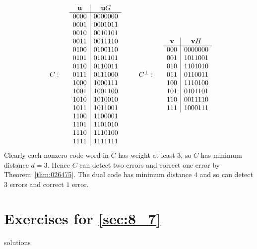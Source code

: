 \begin{equation*}
	\begin{array}{rrc|c}
	&& \vect{u} & \vect{u}G \\ \cline{3-4}
	&& 0000 & 0000000 \\
	&& 0001 & 0001011 \\
	&& 0010 & 0010101 \\
	&& 0011 & 0011110 \\
	&& 0100 & 0100110 \\ 
	&& 0101 & 0101101 \\
	&& 0110 & 0110011 \\
	C: && 0111 & 0111000 \\
	&& 1000 & 1000111 \\
	&& 1001 & 1001100 \\
	&& 1010 & 1010010 \\
	&& 1011 & 1011001 \\
	&& 1100 & 1100001 \\
	&& 1101 & 1101010 \\
	&& 1110 & 1110100 \\
	&& 1111 & 1111111 
	\end{array} 
        \quad \quad 
    \begin{array}{rrc|c}
	&& \vect{v} & \vect{v}H \\ \cline{3-4}
	&& 000 & 0000000 \\
	&& 001 & 1011001 \\
	&& 010 & 1101010 \\
	C^\perp: && 011 & 0110011 \\
	&& 100 & 1110100 \\ 
	&& 101 & 0101101 \\
	&& 110 & 0011110 \\
	&& 111 & 1000111 
	\end{array}
\end{equation*}
Clearly each nonzero code word in $C$ has weight at least $3$, so $C$ has minimum distance $d = 3$. Hence $C$ can detect two errors and correct one error by Theorem~\ref{thm:026475}. The dual code has minimum distance $4$ and so can detect $3$ errors and correct $1$ error.


\section*{Exercises for \ref{sec:8_7}}

\begin{Filesave}{solutions}
\end{Filesave}

